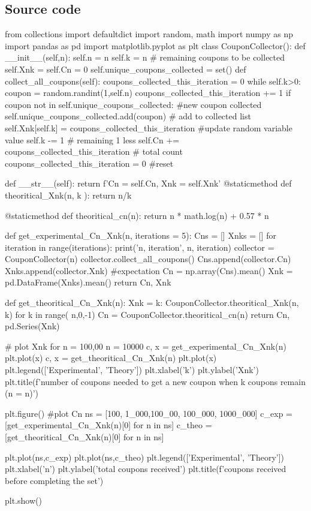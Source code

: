 \documentclass{homeworg}
\let\Oldsubsection\subsection
\renewcommand{\subsection}{\FloatBarrier\Oldsubsection}
\begin{document}
\subsection{Source code}
\begin{python}


from collections import defaultdict
import random, math
import numpy as np
import pandas as pd
import matplotlib.pyplot as plt
class CouponCollector():
    def __init__(self,n):
        self.n = n
        self.k = n # remaining coupons to be collected
        self.Xnk =  {}
        self.Cn = 0
        self.unique_coupons_collected = set()
    def collect_all_coupons(self):
        coupons_collected_this_iteration = 0
        while self.k>0:
            coupon = random.randint(1,self.n)
            coupons_collected_this_iteration += 1
            if coupon not in self.unique_coupons_collected:
                #new coupon collected
                self.unique_coupons_collected.add(coupon) # add to collected list
                self.Xnk[self.k] = coupons_collected_this_iteration #update random variable value
                self.k -= 1 # remaining 1 less
                self.Cn += coupons_collected_this_iteration # total count
                coupons_collected_this_iteration = 0 #reset
    
    def __str__(self):
        return f'Cn = {self.Cn}, Xnk = {self.Xnk}'
    @staticmethod
    def theoritical_Xnk(n, k ):
        return n/k
    
    @staticmethod
    def theoritical_cn(n):
        return n * math.log(n) + 0.57 * n

def get_experimental_Cn_Xnk(n, iterations = 5):
    Cns = []
    Xnks = []
    for iteration in range(iterations):
        print('n, iteration', n, iteration)
        collector = CouponCollector(n)
        collector.collect_all_coupons()
        Cns.append(collector.Cn)
        Xnks.append(collector.Xnk)
    #expectation
    Cn = np.array(Cns).mean()
    Xnk = pd.DataFrame(Xnks).mean()
    return Cn, Xnk

def get_theoritical_Cn_Xnk(n):
    Xnk = {k: CouponCollector.theoritical_Xnk(n, k) for k in range( n,0,-1)}
    Cn = CouponCollector.theoritical_cn(n)
    return Cn, pd.Series(Xnk)

# plot Xnk for n = 100,00
n = 10000
c, x = get_experimental_Cn_Xnk(n)
plt.plot(x)
c, x = get_theoritical_Cn_Xnk(n)
plt.plot(x)
plt.legend(['Experimental', 'Theory'])
plt.xlabel('k')
plt.ylabel('Xnk')
plt.title(f'number of coupons needed to get a new coupon when k coupons remain (n = {n})')


plt.figure()
#plot Cn
ns = [100, 1_000,100_00, 100_000, 1000_000]
c_exp = [get_experimental_Cn_Xnk(n)[0] for n in ns]
c_theo = [get_theoritical_Cn_Xnk(n)[0] for n in ns]

plt.plot(ns,c_exp)
plt.plot(ns,c_theo)
plt.legend(['Experimental', 'Theory'])
plt.xlabel('n')
plt.ylabel('total coupons received')
plt.title(f'coupons received before completing the set')


plt.show()
\end{python}
\end{document}
